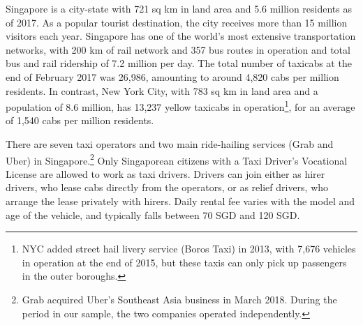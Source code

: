 \documentclass[reviewmode]{restat}
\begin{document}
Singapore is a city-state with 721 sq km in land area and 5.6 million residents as of 2017. 
As a popular tourist destination, the city receives more than 15 million visitors each year.
Singapore has one of the world's most extensive transportation networks, with 200 km of rail network and
357 bus routes in operation
and total bus and rail ridership of 7.2 million per day.  
The total number of taxicabs at the end of February 2017 was 26,986, amounting to around 4,820 cabs
per million residents. In contrast, New York City, with 783 sq km in land area and a population of
8.6 million, has 13,237 yellow taxicabs in operation\footnote{NYC added street hail livery service
(Boros Taxi) in 2013, with 7,676 vehicles in operation at the end of 2015, but these taxis can only
pick up passengers in the outer boroughs.}, for an average of 1,540 cabs per million residents.

There are seven taxi operators 
and two main ride-hailing services (Grab and Uber) in Singapore.\footnote{Grab acquired Uber's
Southeast Asia business in March 2018. %
During the period in our sample, the two companies operated independently.} Only Singaporean citizens
with a Taxi Driver's Vocational License are allowed to work as taxi drivers. Drivers can join either 
as hirer drivers, who lease cabs directly from the operators, or as relief drivers, who arrange the 
lease privately with hirers. Daily rental fee varies with the model and age of the vehicle, 
and typically falls between 70 SGD and 120 SGD.
\end{document}
